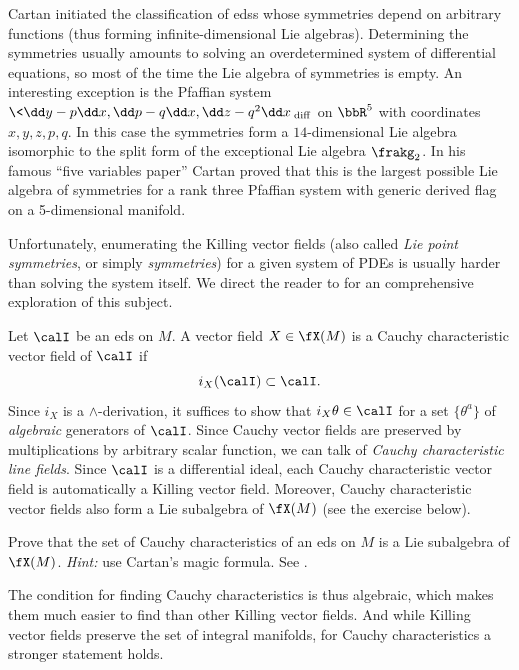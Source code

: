 \begin{rem}
    Cartan initiated the classification of \glspl{eds} whose symmetries depend on arbitrary functions (thus forming infinite-dimensional Lie algebras). Determining the symmetries usually amounts to solving an overdetermined system of differential equations, so most of the time the Lie algebra of symmetries is empty. An interesting exception is the Pfaffian system $\<\dd y-p\dd x,\dd p-q\dd x,\dd z-q^2\dd x\>_{\mathrm{diff}}$ on $\bbR^5$ with coordinates $x,y,z,p,q$. In this case the symmetries form a $14$-dimensional Lie algebra isomorphic to the split form of the exceptional Lie algebra $\frakg_2$. In his famous ``five variables paper'' Cartan proved that this is the largest possible Lie algebra of symmetries for a rank three Pfaffian system with generic derived flag on a 5-dimensional manifold.
\end{rem}

Unfortunately, enumerating the Killing vector fields (also called \emph{Lie point symmetries}, or simply \emph{symmetries}) for a given system of PDEs is usually harder than solving the system itself. We direct the reader to \cite{Olver} for an comprehensive exploration of this subject.

\begin{defn}
    Let $\calI$ be an \gls{eds} on $M$. A vector field $X\in\fX(M)$ is a Cauchy characteristic vector field of $\calI$ if 
    \[i_X (\calI)\subset \calI.\]
    Since $i_X$ is a $\wedge$-derivation, it suffices to show that $i_X\theta\in\calI$ for a set $\{\theta^a\}$ of \emph{algebraic} generators of $\calI$. Since Cauchy vector fields are preserved by multiplications by arbitrary scalar function, we can talk of \emph{Cauchy characteristic line fields}. Since $\calI$ is a differential ideal, each Cauchy characteristic vector field is automatically a Killing vector field. Moreover, Cauchy characteristic vector fields also form a Lie subalgebra of $\fX(M)$ (see the exercise below).
\end{defn}

\begin{xca}
    Prove that the set of Cauchy characteristics of an \gls{eds} on $M$ is a Lie subalgebra of $\fX(M)$. \emph{Hint:} use Cartan's magic formula. See \cite[Prop.~2.1]{Bryant}.
\end{xca}

The condition for finding Cauchy characteristics is thus algebraic, which makes them much easier to find than other Killing vector fields. And while Killing vector fields preserve the set of integral manifolds, for Cauchy characteristics a stronger statement holds.

